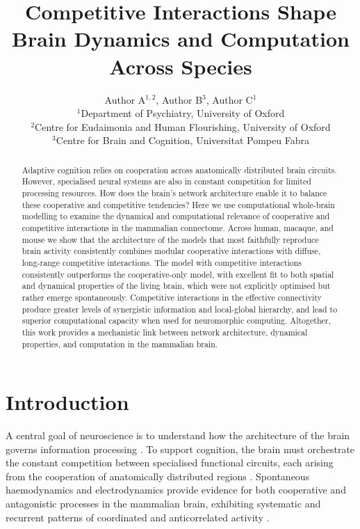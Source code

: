 \documentclass{article}
\title{Competitive Interactions Shape Brain Dynamics and Computation Across Species}
\author{
Author A$^{1,2}$, Author B$^{3}$, Author C$^{1}$ \\
$^{1}$Department of Psychiatry, University of Oxford \\
$^{2}$Centre for Eudaimonia and Human Flourishing, University of Oxford \\
$^{3}$Centre for Brain and Cognition, Universitat Pompeu Fabra
}
\date{}
\begin{document}
\maketitle

\begin{abstract}
Adaptive cognition relies on cooperation across anatomically distributed brain circuits. However, specialised neural systems are also in constant competition for limited processing resources. How does the brain's network architecture enable it to balance these cooperative and competitive tendencies? Here we use computational whole-brain modelling to examine the dynamical and computational relevance of cooperative and competitive interactions in the mammalian connectome. Across human, macaque, and mouse we show that the architecture of the models that most faithfully reproduce brain activity consistently combines modular cooperative interactions with diffuse, long-range competitive interactions. The model with competitive interactions consistently outperforms the cooperative-only model, with excellent fit to both spatial and dynamical properties of the living brain, which were not explicitly optimised but rather emerge spontaneously. Competitive interactions in the effective connectivity produce greater levels of synergistic information and local-global hierarchy, and lead to superior computational capacity when used for neuromorphic computing. Altogether, this work provides a mechanistic link between network architecture, dynamical properties, and computation in the mammalian brain.
\end{abstract}

\section{Introduction}

A central goal of neuroscience is to understand how the architecture of the brain governs information processing \citep{bassett2019physics, suarez2024brain, avena2018communication}. To support cognition, the brain must orchestrate the constant competition between specialised functional circuits, each arising from the cooperation of anatomically distributed regions \citep{cocchi2013dynamic, dehaene2011experimental, rissman2012competitive, mashour2020conscious}. Spontaneous haemodynamics and electrodynamics provide evidence for both cooperative and antagonistic processes in the mammalian brain, exhibiting systematic and recurrent patterns of coordinated and anticorrelated activity \citep{fox2005human, mantini2012large, stafford2014large, boly2022functional}.
\end{document}
